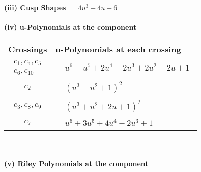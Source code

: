 \documentclass[1p]{elsarticle_modified}
\theoremstyle{definition}
\begin{document}
\flushleft \textbf{(iii) Cusp Shapes $= 4 u^3+4 u-6$}\\~\\
\newpage\renewcommand{\arraystretch}{1}
\flushleft \textbf{(iv) u-Polynomials at the component}\newline \\
\begin{tabular}{m{50pt}|m{274pt}}
Crossings & \hspace{64pt}u-Polynomials at each crossing \\
\hline $$\begin{aligned}c_{1},c_{4},c_{5}\\c_{6},c_{10}\end{aligned}$$&$\begin{aligned}
&u^6- u^5+2 u^4-2 u^3+2 u^2-2 u+1
\end{aligned}$\\
\hline $$\begin{aligned}c_{2}\end{aligned}$$&$\begin{aligned}
&(u^3- u^2+1)^2
\end{aligned}$\\
\hline $$\begin{aligned}c_{3},c_{8},c_{9}\end{aligned}$$&$\begin{aligned}
&(u^3+u^2+2 u+1)^2
\end{aligned}$\\
\hline $$\begin{aligned}c_{7}\end{aligned}$$&$\begin{aligned}
&u^6+3 u^5+4 u^4+2 u^3+1
\end{aligned}$\\
\hline
\end{tabular}\\~\\
\newpage\renewcommand{\arraystretch}{1}
\flushleft \textbf{(v) Riley Polynomials at the component}\newline \\
\end{document}
